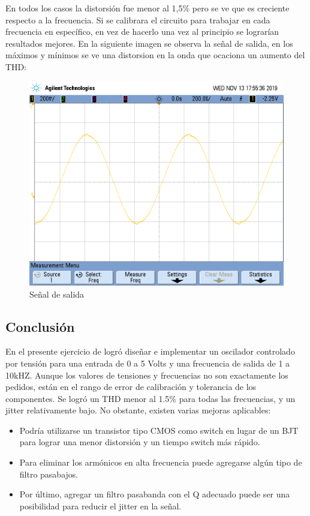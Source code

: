 En todos los casos la distorsión fue menor al 1,5\% pero se ve que es creciente respecto a la frecuencia. Si se calibrara el circuito para trabajar en cada frecuencia en específico, en vez de hacerlo una vez al principio se lograrían resultados mejores. En la siguiente imagen se observa la señal de salida, en los máximos y mínimos se ve una distorsion en la onda que ocaciona un aumento del THD:

\begin{figure}[H]	
	\centering
	\includegraphics[width=1\textwidth]{Imagenes_Ej3/senoidal.png}
	\caption{Señal de salida}
	\label{fig:senoidal}
\end{figure}


\subsection{Conclusión}

En el presente ejercicio de logró diseñar e implementar un oscilador controlado por tensión para una entrada de 0 a 5 Volts y una frecuencia de salida de 1 a 10kHZ. Aunque los valores de tensiones y frecuencias no son exactamente los pedidos, están en el rango de error de calibración y tolerancia de los componentes. Se logró un THD menor al 1.5\% para todas las frecuencias, y un jitter relativamente bajo. No obstante, existen varias mejoras aplicables:


\begin{itemize}
\item Podría utilizarse un transistor tipo CMOS como switch en lugar de un BJT para lograr una menor distorsión y un tiempo  switch más rápido.
\item Para eliminar los armónicos en alta frecuencia puede agregarse algún tipo de filtro pasabajos.
\item Por último, agregar un filtro pasabanda con el Q adecuado puede ser una posibilidad para reducir el jitter en la señal.
\end{itemize}
